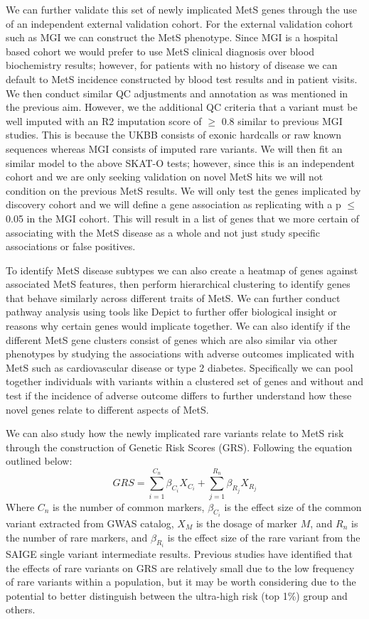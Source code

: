\documentclass[11pt]{article}
\begin{document}
We can further validate this set of newly implicated MetS genes through the use of an independent external validation cohort. For the external validation cohort such as MGI we can construct the MetS phenotype. Since MGI is a hospital based cohort we would prefer to use MetS clinical diagnosis over blood biochemistry results; however, for patients with no history of disease we can default to MetS incidence constructed by blood test results and in patient visits. We then conduct similar QC adjustments and annotation as was mentioned in the previous aim. However, we the additional QC criteria that a variant must be well imputed with an R2 imputation score of $\ge$ 0.8 similar to previous MGI studies. This is because the UKBB consists of exonic hardcalls or raw known sequences whereas MGI consists of imputed rare variants. We will then fit an similar model to the above SKAT-O tests; however, since this is an independent cohort and we are only seeking validation on novel MetS hits we will not condition on the previous MetS results. We will only test the genes implicated by discovery cohort and we will define a gene association as replicating with a p $\le$ 0.05 in the MGI cohort. This will result in a list of genes that we more certain of associating with the MetS disease as a whole and not just study specific associations or false positives.

To identify MetS disease subtypes we can also  create a heatmap of genes against associated MetS features, then perform hierarchical clustering to identify genes that behave similarly across different traits of MetS. We can further conduct pathway analysis using tools like Depict to further offer biological insight or reasons why certain genes would implicate together. We can also identify if the different MetS gene clusters consist of genes which are also similar via other phenotypes by studying the associations with adverse outcomes implicated with MetS such as cardiovascular disease or type 2 diabetes. Specifically we can pool together individuals with variants within a clustered set of genes and without and test if the incidence of adverse outcome differs to further understand how these novel genes relate to different aspects of MetS.

We can also study how the newly implicated rare variants relate to MetS risk through the construction of Genetic Risk Scores (GRS). Following the equation outlined below:
$$GRS = \sum_{i=1}^{C_n} \beta_{C_i}X_{C_i} + \sum_{j=1}^{R_n} \beta_{R_j}X_{R_j}$$
Where $C_n$ is the number of common markers, $\beta_{C_i}$ is the effect size of the common variant extracted from GWAS catalog, $X_M$ is the dosage of marker $M$, and $R_n$ is the number of rare markers, and $\beta_{R_i}$ is the effect size of the rare variant from the SAIGE single variant intermediate results. Previous studies have identified that the effects of rare variants on GRS are relatively small due to the low frequency of rare variants within a population, but it may be worth considering due to the potential to better distinguish between the ultra-high risk (top 1\%) group and others. 
\end{document}
